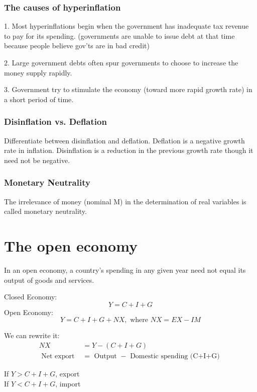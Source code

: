 \documentclass[12pt]{article}
\begin{document}
\subsubsection{The causes of hyperinflation}
1. Most hyperinflations begin when the government has inadequate tax revenue to pay
for its spending. (governments are unable to issue debt at that time because people
believe gov'ts are in bad credit)

2. Large government debts often spur governments to choose to increase the money
supply rapidly.

3. Government try to stimulate the economy (toward more rapid growth rate) in a short
period of time.


\subsubsection{Disinflation vs. Deflation}
Differentiate between disinflation and deflation. Deflation is a negative growth rate in inflation. Disinflation is a reduction in the previous growth rate though it need not be negative. 


\subsubsection{Monetary Neutrality}
The irrelevance of money (nominal M) in the determination of real variables is called
monetary neutrality.



\section{The open economy}
In an open economy, a country’s spending in any given year need not equal its output 
of goods and services.

Closed Economy:
\begin{equation*}
Y = C + I + G
\end{equation*}
Open Economy:
\begin{equation*}
Y = C + I + G + NX, \text{ where } NX = EX - IM
\end{equation*}

We can rewrite it:
\begin{align*}
NX &= Y - (C + I + G)\\
\text{ Net export } &= \text{ Output } - \text{ Domestic spending (C+I+G) }
\end{align*}

If $ Y>C + I + G $, export\\
If $ Y<C + I + G $, import\\
\end{document}
